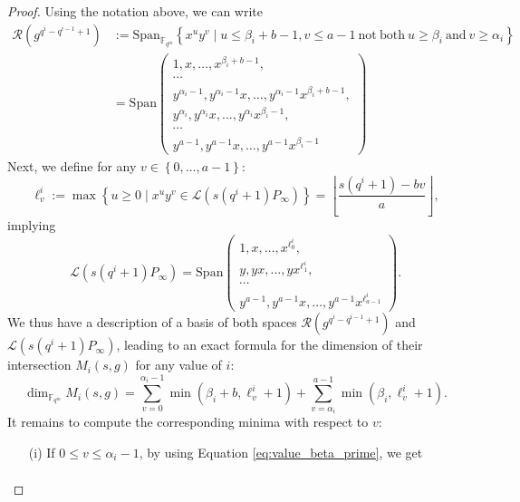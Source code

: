 \documentclass[a4paper]{amsart}
\theoremstyle{definition}
\theoremstyle{remark}
\newcommand{\calL}{\mathcal{L}}
\newcommand{\calR}{\mathcal{R}}
\newcommand{\fqm}{\mathbb{F}_{q^m}}
\newcommand{\set}[1]{\left\{#1\right\}}
\begin{document}
\begin{proof}
Using the notation above, we can write
\begin{align*}
\calR\left(g^{q^i-q^{i-1}+1}\right) &:= \mathrm{Span}_{\fqm} \left\{x^uy^v \mid u \leq \beta_i+b-1 , v \leq a-1 \ \mathrm{not \ both} \ u \geq \beta_i \ \mathrm{and} \ v \geq \alpha_i\right\} \\
&= \mathrm{Span}    \left( \begin{array}{c}
         1,x,\dots,x^{\beta_i +b-1},   \\
         \cdots \\
         y^{\alpha_i -1},y^{\alpha_i -1}x,\dots,y^{\alpha_i -1}x^{\beta_i +b-1}, \\
          y^{\alpha_i},y^{\alpha_i}x,\dots,y^{\alpha_i}x^{\beta_i-1}, \\
         \cdots \\
         y^{a-1},y^{a-1}x,\dots,y^{a-1}x^{\beta_i-1}
    \end{array}
    \right)
\end{align*}
Next, we define for any $v \in \set{0,\dots,a-1}$:
$$\ell^i_v := \max \set{u \geq 0 \mid x^uy^v \in \calL(s(q^i+1)P_\infty)} = \left\lfloor \dfrac{s(q^i+1)-bv}{a}\right\rfloor,$$
implying
\begin{equation*}
\calL(s(q^i+1)P_\infty) = \mathrm{Span}    \left( \begin{array}{c}
         1,x,\dots,x^{\ell^i_0},   \\
         y,yx,\dots,yx^{\ell^i_1}, \\
         \cdots \\
         y^{a-1},y^{a-1}x,\dots,y^{a-1}x^{\ell^i_{a-1}}
    \end{array}
    \right).
\end{equation*}
We thus have a description of a basis of both spaces $\calR(g^{q^i-q^{i-1}+1})$ and $\calL(s(q^i+1)P_\infty)$, leading to an exact formula for the dimension of their intersection $M_i(s,g)$ for any value of $i$:
\begin{equation} \label{eq:exact_dimension_M_i}
\dim_{\fqm} M_i(s,g) = \sum\limits_{v=0}^{\alpha_i-1} \min(\beta_i+b,\ell_v^i+1) + \sum\limits_{v=\alpha_i}^{a-1} \min(\beta_i,\ell_v^i+1).
\end{equation}
It remains to compute the corresponding minima with respect to $v$:
\begin{itemize}
    \item[(i)] If $0 \leq v \leq \alpha_i-1$, by using Equation \eqref{eq:value_beta_prime}, we get
    \begin{align*}

\end{align*}
\end{itemize}
\end{proof}
\end{document}

